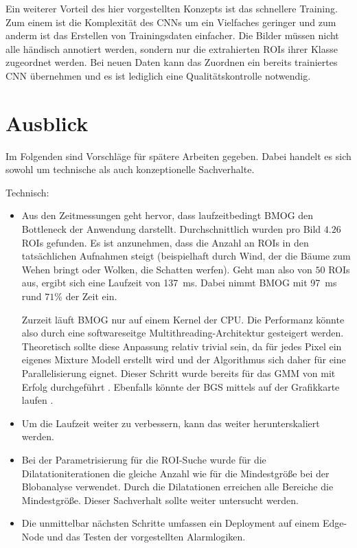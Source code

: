 Ein weiterer Vorteil des hier vorgestellten Konzepts ist das schnellere Training.
Zum einem ist die Komplexität des \ac{CNN}s um ein Vielfaches geringer und zum anderm ist das Erstellen von Trainingsdaten einfacher.
Die Bilder müssen nicht alle händisch annotiert werden, sondern nur die extrahierten \acp{ROI} ihrer Klasse zugeordnet werden.
Bei neuen Daten kann das Zuordnen ein bereits trainiertes \ac{CNN} übernehmen und es ist lediglich eine Qualitätskontrolle notwendig.


\section{Ausblick}
Im Folgenden sind Vorschläge für spätere Arbeiten gegeben.
Dabei handelt es sich sowohl um technische als auch konzeptionelle Sachverhalte.

\bigskip
Technisch:
\begin{itemize}
    \item
    Aus den Zeitmessungen geht hervor, dass laufzeitbedingt \ac{BMOG} den Bottleneck der Anwendung darstellt.
    Durchschnittlich wurden pro Bild $4.26$ \acp{ROI} gefunden.
    Es ist anzunehmen, dass die Anzahl an \acp{ROI} in den tatsächlichen Aufnahmen steigt (beispielhaft durch Wind, der die Bäume zum Wehen bringt oder Wolken, die Schatten werfen).
    Geht man also von $50$ \acp{ROI} aus, ergibt sich eine Laufzeit von \SI{137}{ms}.
    Dabei nimmt \ac{BMOG} mit \SI{97}{ms} rund $71$\% der Zeit ein.

    Zurzeit läuft \ac{BMOG} nur auf einem Kernel der CPU.
    Die Performanz könnte also durch eine softwareseitge Multithreading-Architektur gesteigert werden.
    Theoretisch sollte diese Anpassung relativ trivial sein, da für jedes Pixel ein eigenes Mixture Modell erstellt wird und der Algorithmus sich daher für eine Parallelisierung eignet.
    Dieser Schritt wurde bereits für das \ac{GMM} von \citeauthor{mabrouk_performance_2019} mit Erfolg durchgeführt \cite{mabrouk_performance_2019}.
    Ebenfalls könnte der \ac{BGS} mittels \mbox{} auf der Grafikkarte laufen \cite{pham_gpu_2010}.

    \item
    Um die Laufzeit weiter zu verbessern, kann das  weiter herunterskaliert werden.

    \item
    Bei der Parametrisierung für die \ac{ROI}-Suche wurde für die Dilatationiterationen die gleiche Anzahl wie für die Mindestgröße bei der Blobanalyse verwendet.
    Durch die Dilatationen erreichen alle Bereiche die Mindestgröße.
    Dieser Sachverhalt sollte weiter untersucht werden.

    \item
    Die unmittelbar nächsten Schritte umfassen ein Deployment auf einem Edge-Node und das Testen der vorgestellten Alarmlogiken.
\end{itemize}


